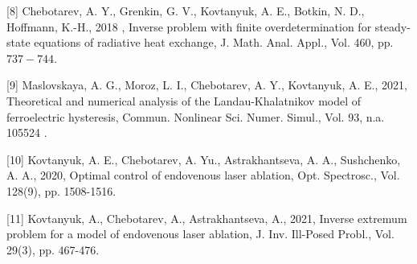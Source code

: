 \documentclass[10pt]{article}
\begin{document}
[8] Chebotarev, A. Y., Grenkin, G. V., Kovtanyuk, A. E., Botkin, N. D., Hoffmann, K.-H., 2018 , Inverse problem with finite overdetermination for steady-state equations of radiative heat exchange, J. Math. Anal. Appl., Vol. 460, pp. $737-744$.

[9] Maslovskaya, A. G., Moroz, L. I., Chebotarev, A. Y., Kovtanyuk, A. E., 2021, Theoretical and numerical analysis of the Landau-Khalatnikov model of ferroelectric hysteresis, Commun. Nonlinear Sci. Numer. Simul., Vol. 93, n.a. 105524 .

[10] Kovtanyuk, A. E., Chebotarev, A. Yu., Astrakhantseva, A. A., Sushchenko, A. A., 2020, Optimal control of endovenous laser ablation, Opt. Spectrosc., Vol. 128(9), pp. 1508-1516.

[11] Kovtanyuk, A., Chebotarev, A., Astrakhantseva, A., 2021, Inverse extremum problem for a model of endovenous laser ablation, J. Inv. Ill-Posed Probl., Vol. 29(3), pp. 467-476.
\end{document}
